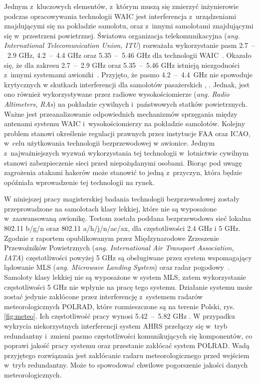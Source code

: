 \documentclass[a4paper, 12pt, twoside]{article}
\begin{document}
Jednym z~kluczowych elementów, z~którym muszą się zmierzyć inżynierowie podczas opracowywania technologii WAIC jest interferencja z~urządzeniami znajdującymi się na pokładzie samolotu, oraz z~innymi samolotami znajdującymi się w~przestrzeni powietrznej. Światowa organizacja telekomunikacyjna (\textit{ang. International Telecomunication Union, ITU}) rozważała wykorzystanie pasm 2.7~--~2.9 GHz, 4.2~--~4.4 GHz oraz 5.35~--~5.46 GHz dla technologii WAIC~\cite{itu}. Okazało się, że dla zakresu 2.7~--~2.9 GHz oraz 5.35~--~5.46 GHz istnieją niezgodności z~innymi systemami awioniki~\cite{itu}. Przyjęto, że pasmo  4.2~--~4.4~GHz nie spowoduje krytycznych w skutkach interferencji dla samolotów pasażerskich \cite{itu}, \cite{waicModulation}. Jednak, jest ono również wykorzystywane przez radiowe wysokościomierze (\textit{ang. Radio Altimeters, RAs}) na pokładzie cywilnych i~państwowych statków powietrznych. Ważne jest przeanalizowanie odpowiednich mechanizmów sprzęgania między antenami systemu WAIC i~wysokościomierzy na pokładzie samolotów. Kolejny problem stanowi określenie regulacji prawnych przez instytucje FAA oraz ICAO, w~celu użytkowania technologii bezprzewodowej w awionice. Jednym z~najważniejszych wyzwań wykorzystania tej technologii w~lotnictwie cywilnym stanowi zabezpieczenie sieci przed niepożądanymi osobami. Biorąc pod uwagę zagrożenia atakami hakerów może stanowić to jedną z~przyczyn, która będzie opóźniała wprowadzenie tej technologii na rynek.

W niniejszej pracy magisterskiej badania technologii bezprzewodowej zostały przeprowadzone na samolotach klasy lekkiej, które nie są wyposażone w~zaawansowaną awionikę. Testom została poddana bezprzewodowa sieć lokalna 802.11 b/g/n oraz 802.11 a/h/j/n/ac/ax, dla częstotliwości 2.4 GHz i 5 GHz. Zgodnie z raportem opublikowanym przez  Międzynarodowe Zrzeszenie Przewoźników Powietrznych (\textit{ang. International Air Transport Association, IATA}) częstotliwości powyżej 5 GHz są obsługiwane przez system wspomagający lądowanie MLS (\textit{ang. Microwave Landing System}) oraz radar pogodowy~\cite{iata}. Samoloty klasy lekkiej nie są wyposażone w system MLS, zatem wykorzystanie częstotliwości 5 GHz nie wpłynie na pracę tego systemu. Działanie systemu może zostać jedynie zakłócone przez interferencję z~systemem radarów meteorologicznych POLRAD, które rozmieszczone są na terenie Polski, rys.\ref{fig:meteo}. Ich częstotliwość pracy wynosi 5.42~--~5.82 GHz \cite{polrad}. W przypadku wykrycia niekorzystnych interferencji system AHRS przełączy się w~tryb redundantny i~zmieni pasmo częstotliwości komunikujących się komponentów, co poprawi jakość pracy systemu oraz przestanie zakłócać system POLRAD. Wadą przyjętego rozwiązania jest zakłócanie radaru meteorologicznego przed wejściem w~tryb redundantny. Może to spowodować chwilowe pogorszenie jakości danych meteorologicznych.
\end{document}
